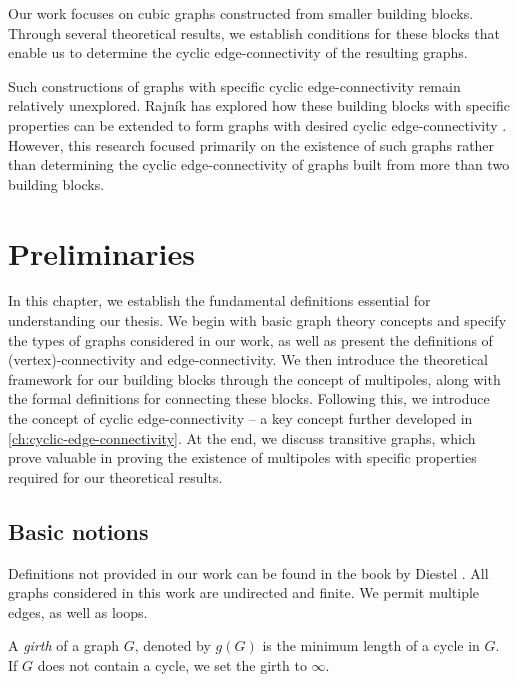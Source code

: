 \documentclass[12pt, twoside]{book}
\begin{document}

Our work focuses on cubic graphs constructed from smaller building blocks. Through several theoretical results, we establish conditions for these blocks that enable us to determine the cyclic \mbox{edge-connectivity} of the resulting graphs.

Such constructions of graphs with specific cyclic edge-connectivity remain relatively unexplored. Rajník has explored how these building blocks with specific properties can be extended to form graphs with desired cyclic edge-connectivity \cite{Rajnik_phd}. However, this research focused primarily on the existence of such graphs rather than determining the cyclic edge-connectivity of graphs built from more than two building blocks.

\todo{}

\chapter{Preliminaries}\label{ch:preliminaries}

In this chapter, we establish the fundamental definitions essential for understanding our thesis. We begin with basic graph theory concepts and specify the types of graphs considered in our work, as well as present the definitions of (vertex)-connectivity and edge-connectivity. We then introduce the theoretical framework for our building blocks through the concept of multipoles, along with the formal definitions for connecting these blocks. Following this, we introduce the concept of cyclic edge-connectivity -- a key concept further developed in \cref{ch:cyclic-edge-connectivity}. At the end, we discuss transitive graphs, which prove valuable in proving the existence of multipoles with specific properties required for our theoretical results.

\section{Basic notions}

Definitions not provided in our work can be found in the book  by Diestel \cite{Diestel}. All graphs considered in this work are undirected and finite. We permit multiple edges, as well as loops.

A \textit{girth} of a graph $G$, denoted by $g(G)$ is the minimum length of a cycle in $G$. If $G$ does not contain a cycle, we set the girth to $\infty$.
\end{document}
